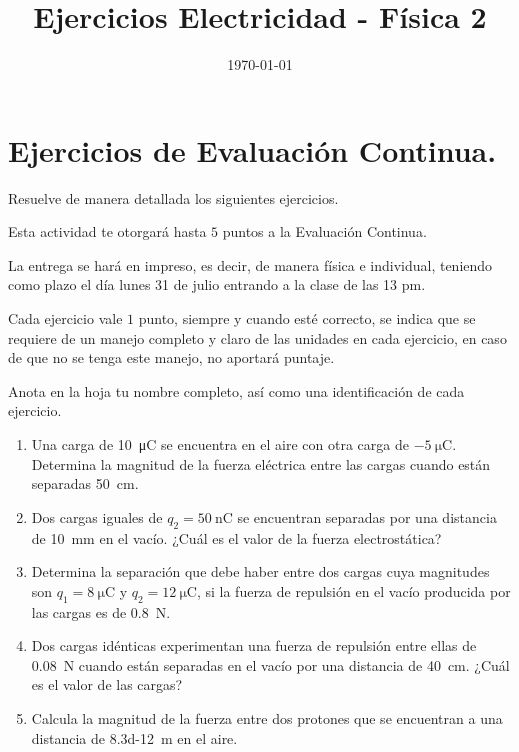 \documentclass[14pt]{extarticle}
\title{\vspace*{-2cm} Ejercicios Electricidad - Física 2\vspace{-5ex}}
\date{\today}
\begin{document}
\maketitle

\section{Ejercicios de Evaluación Continua.}

Resuelve de manera detallada los siguientes ejercicios.
\par
Esta actividad te otorgará hasta $5$ puntos a la Evaluación Continua.
\par
La entrega se hará en impreso, es decir, de manera física e individual, teniendo como plazo el día lunes 31 de julio entrando a la clase de las 13 pm.
\par
Cada ejercicio vale $1$ punto, siempre y cuando esté correcto, se indica que se requiere de un manejo completo y claro de las unidades en cada ejercicio, en caso de que no se tenga este manejo, no aportará puntaje.
\par
Anota en la hoja tu nombre completo, así como una identificación de cada ejercicio.

\begin{enumerate}
\item Una carga de \SI{10}{\micro\coulomb} se encuentra en el aire con otra carga de $-\SI{5}{\micro\coulomb}$. Determina la magnitud de la fuerza eléctrica entre las cargas cuando están separadas \SI{50}{\centi\meter}.
\item Dos cargas iguales de $q_{2} = \SI{50}{\nano\coulomb}$ se encuentran separadas por una distancia de \SI{10}{\milli\meter} en el vacío. ¿Cuál es el valor de la fuerza electrostática?
\item Determina la separación que debe haber entre dos cargas cuya magnitudes son $q_{1} = \SI{8}{\micro\coulomb}$ y $q_{2} = \SI{12}{\micro\coulomb}$, si la fuerza de repulsión en el vacío producida por las cargas es de \SI{0.8}{\newton}.
\item Dos cargas idénticas experimentan una fuerza de repulsión entre ellas de \SI{0.08}{\newton} cuando están separadas en el vacío por una distancia de \SI{40}{\centi\meter}. ¿Cuál es el valor de las cargas?
\item Calcula la magnitud de la fuerza entre dos protones que se encuentran a una distancia de \SI{8.3d-12}{\meter} en el aire.
\end{enumerate}
\end{document}
